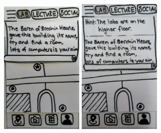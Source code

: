 \documentclass[10pt,twocolumn]{article} %
\begin{document}
\includegraphics[width=0.3\textwidth]{./figures/refined_proto/4.jpg}\hfill
\includegraphics[width=0.3\textwidth]{./figures/refined_proto/5.jpg}\hfill\hfill
\end{document}
